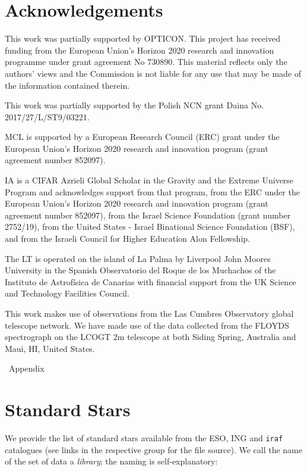 \documentclass[fleqn,usenatbib]{mnras}
\begin{document}
\section*{Acknowledgements}
This work was partially supported by OPTICON. This project has
received funding from the European Union's Horizon 2020 research and
innovation programme under grant agreement No 730890. This material
reflects only the authors' views and the Commission is not liable for
any use that may be made of the information contained therein.

This work was partially supported by the Polish NCN grant Daina
No. 2017/27/L/ST9/03221.

MCL is supported by a European Research Council (ERC) grant under the European Union's Horizon 2020 research and innovation program (grant agreement number 852097).

IA is a CIFAR Azrieli Global Scholar in the Gravity and the Extreme Universe Program and acknowledges support from that program, from the ERC under the European Union's Horizon 2020 research and innovation program (grant agreement number 852097), from the Israel Science Foundation (grant number 2752/19), from the United States - Israel Binational Science Foundation (BSF), and from the Israeli Council for Higher Education Alon Fellowship.

The LT is operated on the island of La Palma by Liverpool
John Moores University in the Spanish Observatorio del Roque
de los Muchachos of the Instituto de Astrof{\'i}sica de Canarias with
financial support from the UK Science and Technology Facilities
Council.

This work makes use of observations from the Las Cumbres Observatory
global telescope network. We have made use of the data collected from
the FLOYDS spectrograph on the LCOGT 2m telescope at both Siding Spring,
Australia and Maui, HI, United States.







\ Appendix

\section{Standard Stars}
\label{appendix:standards}
We provide the list of standard stars available from the ESO, ING and \texttt{iraf} catalogues (see
links in the respective group for the file source). We call the name of the set of
data a \textit{library}; the naming is self-explanatory:
\end{document}
